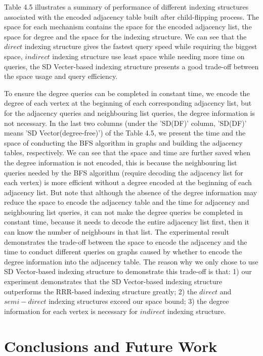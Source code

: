 \documentclass[12pt,glossary]{dalthesis}
\begin{document}
\bigskip

Table 4.5 illustrates a summary of performance of different indexing structures associated with the encoded adjacency table built after child-flipping process. The space for each mechanism contains the space for the encoded adjacency list, the space for degree and the space for the indexing structure. We can see that the $direct$ indexing structure gives the fastest query speed while requiring the biggest space, $indirect$ indexing structure use least space while needing more time on queries, the SD Vecter-based indexing structure presents a good trade-off between the space usage and query efficiency. 

\bigskip
\bigskip

To ensure the degree queries can be completed in constant time, we encode the degree of each vertex at the beginning of each corresponding adjacency list, but for the adjacency queries and neighbouring list queries, the degree information is not necessary. In the last two columns (under the 'SD(DF)' column, 'SD(DF)' means 'SD Vector(degree-free)') of the Table 4.5, we present the time and the space of conducting the BFS algorithm in graphs and building the adjacency tables, respectively. We can see that the space and time are further saved when the degree information is not encoded, this is because the neighbouring list queries needed by the BFS algorithm (require decoding the adjacency list for each vertex) is more efficient without a degree encoded at the beginning of each adjacency list. But note that although the absence of the degree information may reduce the space to encode the adjacency table and the time for adjacency and neighbouring list queries, it can not make the degree queries be completed in constant time, because it needs to decode the entire adjacency list first, then it can know the number of neighbours in that list. The experimental result demonstrates the trade-off between the space to encode the adjacency and the time to conduct different queries on graphs caused by whether to encode the degree information into the adjacency table. The reason why we only chose to use SD Vector-based indexing structure to demonstrate this trade-off is that: 1) our experiment demonstrates that the SD Vector-based indexing structure outperforms the RRR-based indexing structure greatly; 2) the $direct$ and $semi-direct$ indexing structures exceed our space bound; 3) the degree information for each vertex is necessary for $indirect$ indexing structure.  


\chapter{Conclusions and Future Work}
\end{document}
